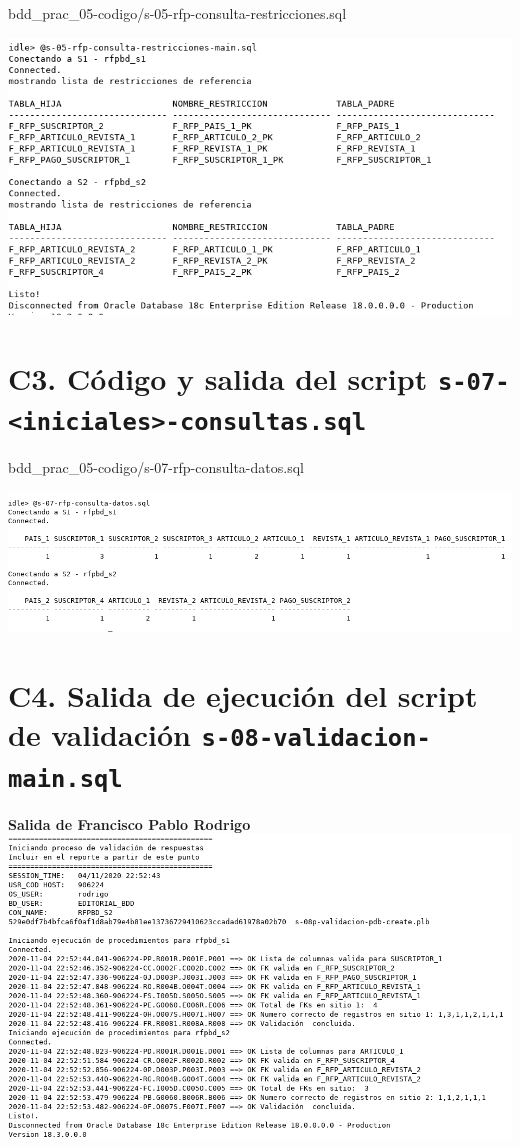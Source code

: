 \documentclass{article}
\begin{document}

{bdd_prac_05-codigo/s-05-rfp-consulta-restricciones.sql}

\includegraphics[width=0.8\linewidth]{bdd_prac05-c2-restricciones}

\section*{C3. Código y salida del script 
\texttt{s-07-<iniciales>-consultas.sql}}


{bdd_prac_05-codigo/s-07-rfp-consulta-datos.sql}

\includegraphics[width=\linewidth]{bdd_prac05-c3-consulta-datos}

\section*{C4. Salida de ejecución del script de validación 
\texttt{s-08-validacion-main.sql}}            

\textbf{Salida de Francisco Pablo Rodrigo}\\
\includegraphics[width=\linewidth]{bdd_prac05-validador-rodrigo}
\end{document}
